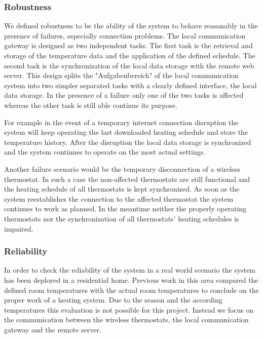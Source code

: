 \subsubsection{Robustness}

We defined robustness to be the ability of the system to behave reasonably in the presence of failures, especially connection problems.
The local communication gateway is designed as two independent tasks.
The first task is the retrieval and storage of the temperature data and the application of the defined schedule.
The second task is the synchronization of the local data storage with the remote web server.
This design splits the "Aufgabenbereich" of the local communication system into two simpler separated tasks with a clearly defined interface, the local data storage.
In the presence of a failure only one of the two tasks is affected whereas the other task is still able continue its purpose.

For example in the event of a temporary internet connection disruption the system will keep operating the last downloaded heating schedule and store the temperature history.
After the disruption the local data storage is synchronized and the system continues to operate on the most actual settings.

Another failure scenario would be the temporary disconnection of a wireless thermostat.
In such a case the non-affected thermostats are still functional and the heating schedule of all thermostats is kept synchronized.
As soon as the system reestablishes the connection to the affected thermostat the system continues to work as planned.
In the meantime neither the properly operating thermostats nor the synchronization of all thermostats' heating schedules is impaired.


\subsubsection{Reliability}

In order to check the reliability of the system in a real world scenario the system has been deployed in a residential home.
Previous work in this area compared the defined room temperatures with the actual room temperatures to conclude on the proper work of a heating system\cite{eigenmann2012opportunisticSensing}.
Due to the season and the according temperatures this evaluation is not possible for this project.
Instead we focus on the communication between the wireless thermostats, the local communication gateway and the remote server.

